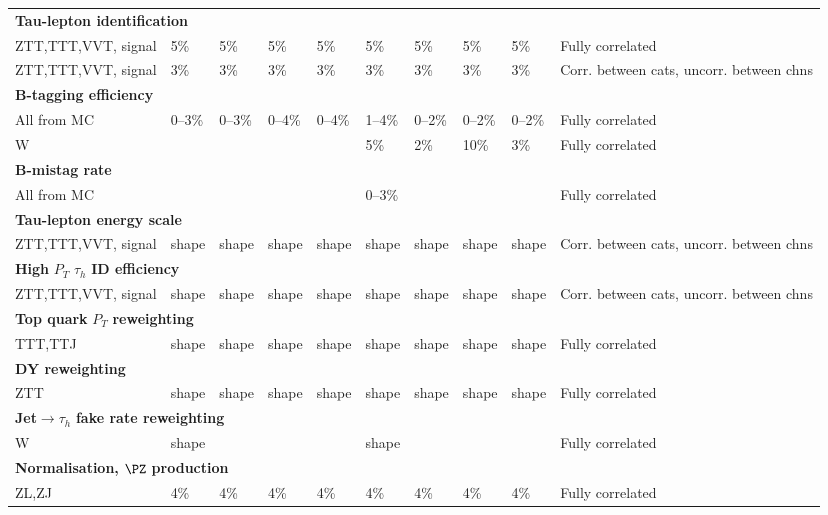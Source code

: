 \begin{table}[!h]
\begin{center}
{\begin{tabular}{p{2cm}|p{1cm}p{1cm}p{1cm}p{1cm}|p{1cm}p{1cm}p{1cm}p{1cm}|p{3cm}}
    \hline
    \multicolumn{10}{l}{\textbf{Tau-lepton identification}}\\
    ZTT,TTT,VVT, signal     & 5\% & 5\% & 5\% & 5\%   & 5\%  & 5\% & 5\% & 5\% & Fully correlated \\
    ZTT,TTT,VVT, signal     & 3\% & 3\% & 3\% & 3\%   & 3\%  & 3\% & 3\% & 3\% & Corr. between cats, uncorr. between chns    \\
    \hline
    \multicolumn{10}{l}{\textbf{B-tagging efficiency} }\\
    All from MC & 0--3\% & 0--3\% & 0--4\% & 0--4\% & 1--4\% & 0--2\% & 0--2\% & 0--2\% & Fully correlated\\
    W &  &  &  &  & 5\% & 2\% & 10\% & 3\% & Fully correlated\\
    \hline
    \multicolumn{10}{l}{\textbf{B-mistag rate } }\\
    All from MC & & & & & 0--3\% & & & & Fully correlated\\
    \hline
    \multicolumn{10}{l}{\textbf{Tau-lepton energy scale}}\\
    ZTT,TTT,VVT, signal     & shape & shape & shape & shape  & shape & shape & shape & shape & Corr. between cats, uncorr. between chns   \\
    \hline
    \multicolumn{10}{l}{\textbf{High} $P_{T}$ $\tau_h$\textbf{ ID efficiency } } \\
    ZTT,TTT,VVT, signal    & shape & shape & shape & shape  & shape & shape & shape & shape & Corr. between cats, uncorr. between chns   \\
    \hline
    \multicolumn{10}{l}{\textbf{Top quark} $P_{T}$ \textbf{reweighting} }\\
    TTT,TTJ  & shape & shape & shape & shape & shape & shape & shape & shape & Fully correlated    \\
    \hline
    \multicolumn{10}{l}{\textbf{DY reweighting } }\\
    ZTT       & shape & shape & shape & shape  & shape & shape & shape & shape &Fully correlated              \\
    \hline
    \multicolumn{10}{l}{\textbf{Jet}$\rightarrow\tau_h$ \textbf{fake rate reweighting } }\\
    W         & shape &  &  &   & shape &  &  &  &Fully correlated              \\
    \hline
    \multicolumn{10}{l}{\textbf{Normalisation, }$\PZ$ \textbf{production} }\\
    ZL,ZJ       & 4\% & 4\% & 4\% & 4\% & 4\%  & 4\% & 4\% & 4\% & Fully correlated              \\

\end{tabular}}
\end{center}
\end{table}
